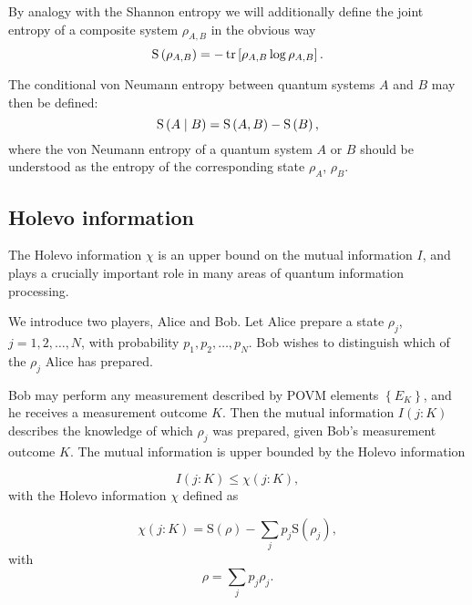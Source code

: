 By analogy with the Shannon entropy we will additionally define the joint entropy of a composite system $\rho_{A, B}$ in the obvious way
\begin{equation}
\text{S}\left(\rho_{A, B}\right) = - \tr\left[\rho_{A, B} \log \rho_{A, B}\right].
\end{equation}

\noindent The conditional von Neumann entropy between quantum systems $A$ and $B$ may then be defined:
\begin{equation}
\text{S}\left(A \; \middle| \; B\right) = \text{S}\left(A, B\right) - \text{S}\left(B\right),
\end{equation}
where the von Neumann entropy of a quantum system $A$ or $B$ should be understood as the entropy of the corresponding state $\rho_A$, $\rho_B$.


\FloatBarrier
\subsection{Holevo information}\label{sec:intro_holevo}
The Holevo information $\chi$ is an upper bound on the mutual information $I$, and plays a crucially important role in many areas of quantum information processing. 

We introduce two players, Alice and Bob. Let Alice prepare a state $\rho_j$, $j = 1, 2, \dots, N$, with probability $p_1, p_2, \dots, p_N$. Bob wishes to distinguish which of the $\rho_j$ Alice has prepared. 

Bob may perform any measurement described by POVM elements $\left\{E_K\right\}$, and he receives a measurement outcome $K$. Then the mutual information $I\left(j : K\right)$ describes the knowledge of which $\rho_j$ was prepared, given Bob's measurement outcome $K$. The mutual information is upper bounded by the Holevo information

\begin{equation}\label{eqn:intro_holevo_bound}
I\left(j : K \right) \le \chi \left(j : K \right),
\end{equation}
with the Holevo information $\chi$ defined as

\begin{equation}\label{eqn:intro_holevo}
\chi\left(j : K\right)  = \text{S}\left(\rho\right) - \sum_j p_j \text{S}\left(\rho_j\right),
\end{equation}
with
\begin{equation}
\rho = \sum_j p_j \rho_j.
\end{equation}

